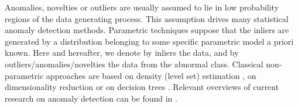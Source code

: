 
\newcommand{\pointSampled}[1]{
    \coordinate (A) at (#1);
    \draw[fill=black] (A) circle (0.03cm);
}

\newcommand{\vide}[1]{}

\label{ocrf:sec:intro}
%
Anomalies, novelties or outliers are usually assumed to lie in low probability
regions of the data generating process.
%
This assumption drives many statistical anomaly detection methods. %
Parametric techniques \citep{Barnett94, Eskin2000} suppose that the inliers are
generated by a distribution belonging to some specific parametric model a
priori known.
%
Here and hereafter, we denote by inliers the  data, and by
outliers/anomalies/novelties the data from the abnormal class.
%
Classical non-parametric approaches are based on density (level set) estimation
\citep{Scholkopf2001, Scott2006, Breunig2000LOF, Quinn2014}, on dimensionality
reduction \citep{Shyu2003, Aggarwal2001} or on decision trees \citep{Liu2008,
Shi2012}.
%
Relevant overviews of current research on anomaly detection can be found in
\citet{Hodge2004survey, Chandola2009survey, Patcha2007survey,
Markou2003survey}.
